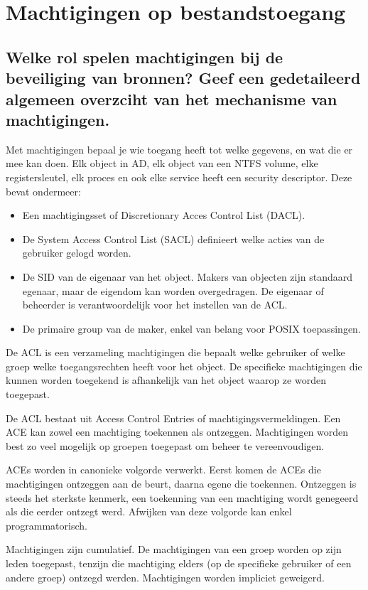 \chapter{Machtigingen op bestandstoegang}

\section{Welke rol spelen machtigingen bij de beveiliging van bronnen? Geef een
gedetaileerd algemeen overzciht van het mechanisme van machtigingen.}

Met machtigingen bepaal je wie toegang heeft tot welke gegevens, en wat die er
mee kan doen. Elk object in AD, elk object van een NTFS volume, elke
registersleutel, elk proces en ook elke service heeft een security descriptor.
Deze bevat ondermeer:
\begin{itemize}
	\item Een machtigingsset of Discretionary Acces Control List (DACL).
	\item De System Access Control List (SACL) definieert welke acties van
		de gebruiker gelogd worden.
	\item De SID van de eigenaar van het object. Makers van objecten zijn
		standaard egenaar, maar de eigendom kan worden overgedragen. De
		eigenaar of beheerder is verantwoordelijk voor het instellen van
		de ACL.
	\item De primaire group van de maker, enkel van belang voor POSIX
		toepassingen.
\end{itemize}

De ACL is een verzameling machtigingen die bepaalt welke gebruiker of welke
groep welke toegangsrechten heeft voor het object. De specifieke machtigingen
die kunnen worden toegekend is afhankelijk van het object waarop ze worden
toegepast.

De ACL bestaat uit Access Control Entries of machtigingsvermeldingen. Een ACE
kan zowel een machtiging toekennen als ontzeggen. Machtigingen worden best zo
veel mogelijk op groepen toegepast om beheer te vereenvoudigen.

ACEs worden in canonieke volgorde verwerkt. Eerst komen de ACEs die machtigingen
ontzeggen aan de beurt, daarna egene die toekennen. Ontzeggen is steeds het
sterkste kenmerk, een toekenning van een machtiging wordt genegeerd als die
eerder ontzegt werd. Afwijken van deze volgorde kan enkel programmatorisch.

Machtigingen zijn cumulatief. De machtigingen van een groep worden op zijn leden
toegepast, tenzijn die machtiging elders (op de specifieke gebruiker of een
andere groep) ontzegd werden. Machtigingen worden impliciet geweigerd.

